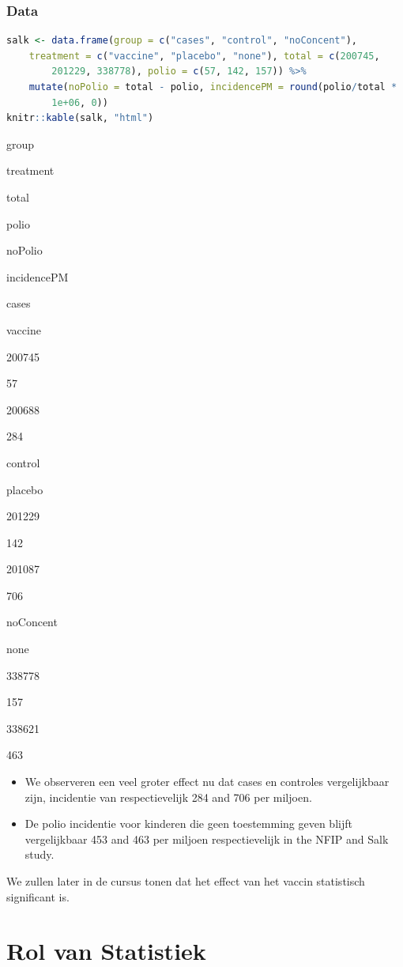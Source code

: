 \documentclass[
  12pt,dutch,coursenotes]{book}
\theoremstyle{definition}
\theoremstyle{definition}
\theoremstyle{definition}
\theoremstyle{definition}
\theoremstyle{remark}
\begin{document}
\hypertarget{data-1}{%
\subsubsection{Data}\label{data-1}}

\begin{lstlisting}[language=R]
salk <- data.frame(group = c("cases", "control", "noConcent"),
    treatment = c("vaccine", "placebo", "none"), total = c(200745,
        201229, 338778), polio = c(57, 142, 157)) %>%
    mutate(noPolio = total - polio, incidencePM = round(polio/total *
        1e+06, 0))
knitr::kable(salk, "html")
\end{lstlisting}

group

treatment

total

polio

noPolio

incidencePM

cases

vaccine

200745

57

200688

284

control

placebo

201229

142

201087

706

noConcent

none

338778

157

338621

463

\begin{itemize}
\item
  We observeren een veel groter effect nu dat cases en controles vergelijkbaar zijn, incidentie van respectievelijk 284 and 706 per miljoen.
\item
  De polio incidentie voor kinderen die geen toestemming geven blijft vergelijkbaar 453 and 463 per miljoen respectievelijk in the NFIP and Salk study.
\end{itemize}

We zullen later in de cursus tonen dat het effect van het vaccin statistisch significant is.

\hypertarget{rol-van-statistiek}{%
\section{Rol van Statistiek}\label{rol-van-statistiek}}
\end{document}
